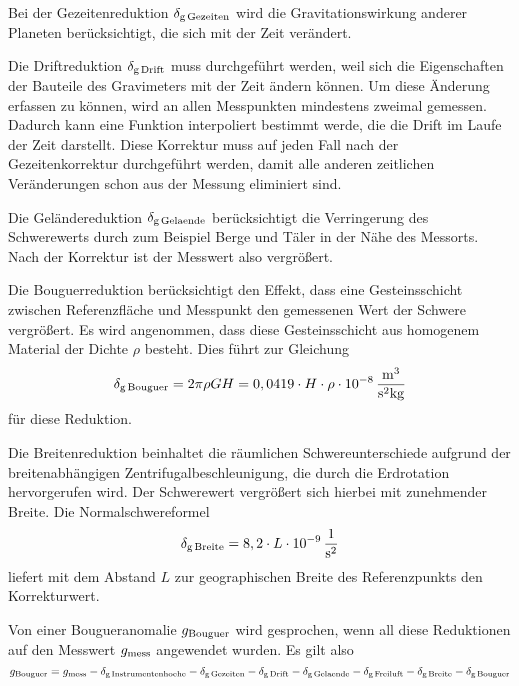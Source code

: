 Bei der Gezeitenreduktion $\delta_{\mathrm{g\,Gezeiten}}$ wird die Gravitationswirkung anderer Planeten berücksichtigt, die sich mit der Zeit verändert.

Die Driftreduktion $\delta_{\mathrm{g\,Drift}}$ muss durchgeführt werden, weil sich die Eigenschaften der Bauteile des Gravimeters mit der Zeit ändern können. Um diese Änderung erfassen zu können, wird an allen Messpunkten mindestens zweimal gemessen. Dadurch kann eine Funktion interpoliert bestimmt werde, die die Drift im Laufe der Zeit darstellt. Diese Korrektur muss auf jeden Fall nach der Gezeitenkorrektur durchgeführt werden, damit alle anderen zeitlichen Veränderungen schon aus der Messung eliminiert sind.

Die Geländereduktion $\delta_{\mathrm{g\,Gelaende}}$ berücksichtigt die Verringerung des Schwerewerts durch zum Beispiel Berge und Täler in der Nähe des Messorts. Nach der Korrektur ist der Messwert also vergrößert.

Die Bouguerreduktion berücksichtigt den Effekt, dass eine Gesteinsschicht zwischen Referenzfläche und Messpunkt den gemessenen Wert der Schwere vergrößert. Es wird angenommen, dass diese Gesteinsschicht aus homogenem Material der Dichte $\rho$ besteht. Dies führt zur Gleichung
\begin{equation}
 \delta_{\mathrm{g\,Bouguer}}=2\pi\rho GH=0,0419\cdot H\cdot\rho\cdot 10^{-8}\,\frac{\mathrm{m^3}}{\mathrm{s^2kg}}
\end{equation}
für diese Reduktion.

Die Breitenreduktion beinhaltet die räumlichen Schwereunterschiede aufgrund der breitenabhängigen Zentrifugalbeschleunigung, die durch die Erdrotation hervorgerufen wird. Der Schwerewert vergrößert sich hierbei mit zunehmender Breite. Die Normalschwereformel
\begin{equation}
 \delta_{\mathrm{g\,Breite}}=8,2\cdot L\cdot 10^{-9}\,\frac{\mathrm{1}}{\mathrm{s^2}}
\end{equation}
liefert mit dem Abstand $L$ zur geographischen Breite des Referenzpunkts den Korrekturwert.


Von einer Bougueranomalie $g_{\mathrm{Bouguer}}$ wird gesprochen, wenn all diese Reduktionen auf den Messwert $g_{\mathrm{mess}}$ angewendet wurden. Es gilt also
\begin{equation}
 g_{\mathrm{Bouguer}}=g_{\mathrm{mess}}-\delta_{\mathrm{g\,Instrumentenhoehe}}-\delta_{\mathrm{g\,Gezeiten}}-\delta_{\mathrm{g\,Drift}}-\delta_{\mathrm{g\,Gelaende}}-\delta_{\mathrm{g\,Freiluft}}-\delta_{\mathrm{g\,Breite}}-\delta_{\mathrm{g\,Bouguer}}
\end{equation}

